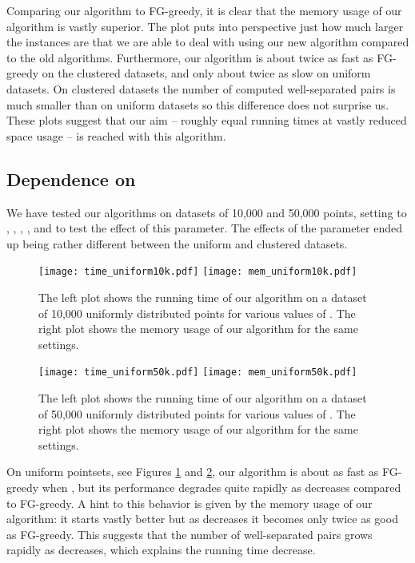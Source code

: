 \documentclass[runningheads,envcountsame,oribibl,orivec]{llncs}
\begin{document}
Comparing our algorithm to FG-greedy, it is clear that the memory usage of our algorithm is vastly superior. The plot puts into perspective just how much larger the instances are that we are able to deal with using our new algorithm compared to the old algorithms. Furthermore, our algorithm is about twice as fast as FG-greedy on the clustered datasets, and only about twice as slow on uniform datasets. On clustered datasets the number of computed well-separated pairs is much smaller than on uniform datasets so this difference does not surprise us. These plots suggest that our aim -- roughly equal running times at vastly reduced space usage -- is reached with this algorithm.

\subsection{Dependence on }

We have tested our algorithms on datasets of 10,000 and 50,000 points, setting  to , , , ,  and  to test the effect of this parameter. The effects of the parameter ended up being rather different between the uniform and clustered datasets.

\begin{figure}[h!]\centering
\texttt{[image: time\_uniform10k.pdf]}
\texttt{[image: mem\_uniform10k.pdf]}
\caption{The left plot shows the running time of our algorithm on a dataset of 10,000 uniformly distributed points for various values of . The right plot shows the memory usage of our algorithm for the same settings.}
\label{figure:uniplot1}
\end{figure}

\begin{figure}[h!]\centering
\texttt{[image: time\_uniform50k.pdf]}
\texttt{[image: mem\_uniform50k.pdf]}
\caption{The left plot shows the running time of our algorithm on a dataset of 50,000 uniformly distributed points for various values of . The right plot shows the memory usage of our algorithm for the same settings.}
\label{figure:uniplot2}
\end{figure}

On uniform pointsets, see Figures \ref{figure:uniplot1} and \ref{figure:uniplot2}, our algorithm is about as fast as FG-greedy when , but its performance degrades quite rapidly as  decreases compared to FG-greedy. A hint to this behavior is given by the memory usage of our algorithm: it starts vastly better but as  decreases it becomes only twice as good as FG-greedy. This suggests that the number of well-separated pairs grows rapidly as  decreases, which explains the running time decrease.
\end{document}
